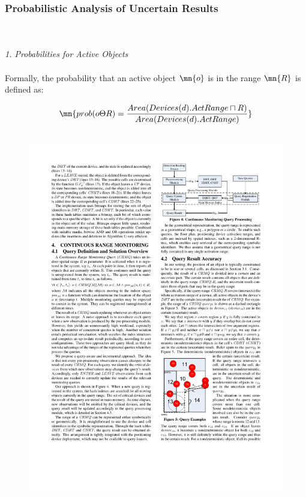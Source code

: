 
\begin{frame}
\frametitle{Probabilistic Analysis of Uncertain Results}

\\~\\
\textit{1. Probabilities for Active Objects}
\\~\\
Formally, the probability that an active object $\mn{o}$ is in the range $\mn{R}$ is defined as:

\begin{equation}
  \mn{prob(o \Theta R) = \frac{Area(Devices(d).ActRange \sqcap R)}{Area(Devices(d).ActRange)}}
\end{equation}

\begin{columns}[c]

  \vspace{-15pt}
  \begin{figure}[tb]
    \includegraphics[width=\columnwidth]{figures/2-2/2-2-5.pdf}
  \end{figure}


\end{columns}
\end{frame}
